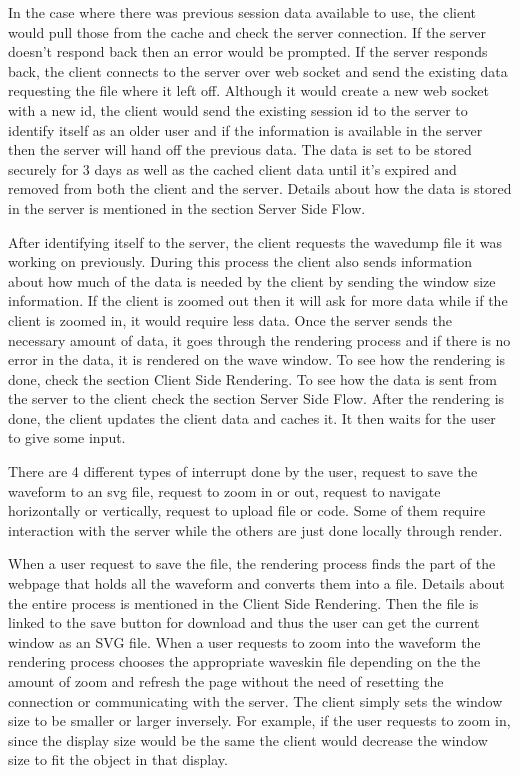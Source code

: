 \documentclass[14pt]{extarticle}
\begin{document}
\par In the case where there was previous session data available to use, the client would pull those from the cache and check the server connection. If the server doesn't respond back then an error would be prompted. If the server responds back, the client connects to the server over web socket and send the existing data requesting the file where it left off. Although it would create a new web socket with a new id, the client would send the existing session id to the server to identify itself as an older user and if the information is available in the server then the server will hand off the previous data. The data is set to be stored securely for 3 days as well as the cached client data until it's expired and removed from both the client and the server. Details about how the data is stored in the server is mentioned in the section Server Side Flow.
\par After identifying itself to the server, the client requests the wavedump file it was working on previously. During this process the client also sends information about how much of the data is needed by the client by sending the window size information. If the client is zoomed out then it will ask for more data while if the client is zoomed in, it would require less data. Once the server sends the necessary amount of data, it goes through the rendering process and if there is no error in the data, it is rendered on the wave window. To see how the rendering is done, check the section Client Side Rendering. To see how the data is sent from the server to the client check the section Server Side Flow.
After the rendering is done, the client updates the client data and caches it. It then waits for the user to give some input.
\par There are 4 different types of interrupt done by the user, request to save the waveform to an svg file, request to zoom in or out, request to navigate horizontally or vertically, request to upload file or code. Some of them require interaction with the server while the others are just done locally through render.
\par When a user request to save the file, the rendering process finds the part of the webpage that holds all the waveform and converts them into a file. Details about the entire process is mentioned in the Client Side Rendering. Then the file is linked to the save button for download and thus the user can get the current window as an SVG file. When a user requests to zoom into the waveform the rendering process chooses the appropriate waveskin file depending on the the amount of zoom and refresh the page without the need of resetting the connection or communicating with the server. The client simply sets the window size to be smaller or larger inversely. For example, if the user requests to zoom in, since the display size would be the same the client would decrease the window size to fit the object in that display.
\end{document}
